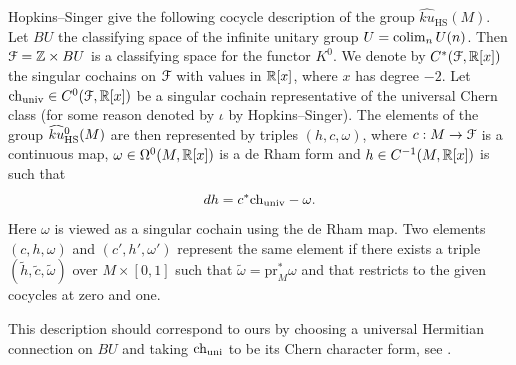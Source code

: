 \documentclass[10pt]{amsart}
\begin{document}
\begin{remark}
Hopkins--Singer \cite{hopkinssinger2005diffcoh} give the following cocycle description of the group $\widehat{ku}_{\mathrm{HS}}(M)$. Let $BU$ the classifying space of the infinite unitary group $U = \operatorname*{colim}_n U(n)$. Then $\mathcal{F} = \mathbb{Z} \times BU$ is a classifying space for the functor $K^0$. We denote by $C^*(\mathcal{F}, \mathbb{R}[x])$ the singular cochains on $\mathcal{F}$ with values in $\mathbb{R}[x]$, where $x$ has degree $-2$. Let $\mathrm{ch}_{\mathrm{univ}} \in C^0(\mathcal{F}, \mathbb{R}[x])$ be a singular cochain representative of the universal Chern class (for some reason denoted by $\iota$ by Hopkins--Singer). The elements of the group $\smash{\widehat{ku}}{}^0_{\mathrm{HS}}(M)$ are then represented by triples $(h, c, \omega)$, where   $c: M \to \mathcal{F}$ is a continuous map, $\omega \in \Omega^0(M, \mathbb{R}[x])$ is a de Rham form and $h \in C^{-1}(M, \mathbb{R}[x])$ is such that
\[
dh = c^*\mathrm{ch}_{\mathrm{univ}} - \omega.
\]
Here $\omega$ is viewed as a singular cochain using the de Rham map. Two elements $(c, h, \omega)$ and $(c', h', \omega')$ represent the same element if there exists a triple $(\tilde{h}, \tilde{c}, \tilde{\omega})$ over $M \times [0, 1]$ such that $\tilde{\omega} = \mathrm{pr}_M^*\omega$ and that restricts to the given cocycles at zero and one.

This description should correspond to ours by choosing a universal Hermitian connection on $BU$ and taking $\mathrm{ch}_{\mathrm{uni}}$ to be its Chern character form, see \cite{narasimhanramanan1961universalconnections}.
\end{remark}

 {\footnotesize
 
 
 }
\end{document}
